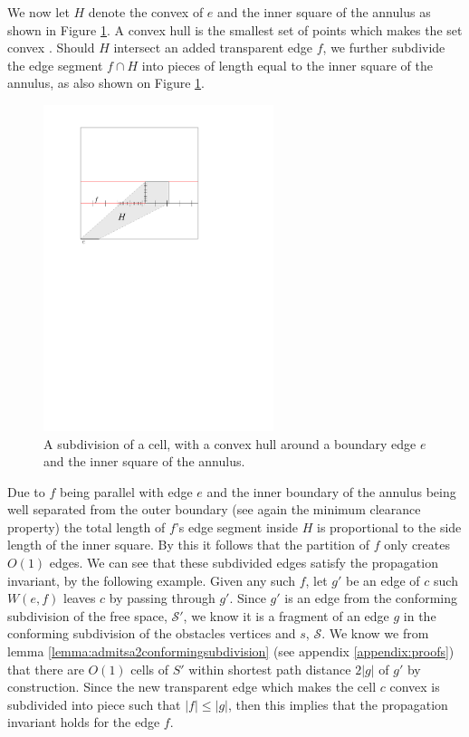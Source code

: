 We now let $H$ denote the convex of $e$ and the inner square of the annulus as shown in Figure 
\ref{fig:subdividedconvexhull}. A convex hull is the smallest set of points which makes the set convex \cite{CompGeo}.  
Should $H$ intersect an added transparent edge $f$, we further subdivide the 
edge segment $f \cap H$ into pieces of length equal to the inner square of the annulus, as also shown on Figure 
\ref{fig:subdividedconvexhull}. 

\begin{figure}[H]
	\centering
	\includegraphics[width=0.6\textwidth]{figures/subdividedconvexhull.pdf}
	\caption{A subdivision of a cell, with a convex hull around a boundary edge $e$ and the inner square of 
    		 the annulus.}
	\label{fig:subdividedconvexhull}
\end{figure}

Due to $f$ being parallel with edge $e$ and the inner boundary of the annulus being well separated from the
outer boundary (see again the minimum clearance property) the total length of $f$'s edge segment inside $H$ is 
proportional to the side length of the inner square. By this it follows that the partition of $f$ only creates 
$O(1)$ edges. We can see that these subdivided edges satisfy the propagation invariant, by the following example. 
Given any such $f$, let $g'$ be an edge of $c$ such $W(e,f)$ leaves $c$ by passing through $g'$. Since $g'$ is an 
edge from the conforming subdivision of the free space, $\mathcal{S}'$, we know it is a fragment of an edge $g$ in 
the conforming subdivision of the obstacles vertices and $s$, $\mathcal{S}$. We know we from lemma 
\ref{lemma:admitsa2conformingsubdivision} (see appendix \ref{appendix:proofs}) that there are $O(1)$ cells of $S'$ 
within shortest path distance $2|g|$ 
of $g'$ by construction. Since the new transparent edge which makes the cell $c$ convex is subdivided into piece 
such that $|f| \leq |g|$, then this implies that the propagation invariant holds for the edge $f$.

